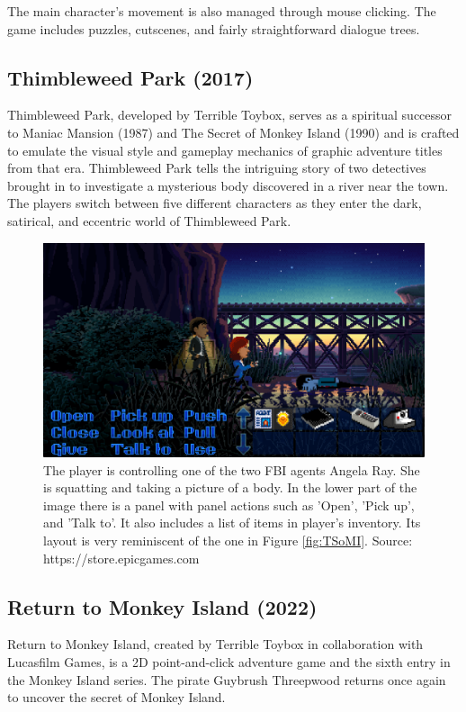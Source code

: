 The main character's movement is also managed through mouse clicking. The game includes puzzles, cutscenes, and fairly straightforward dialogue trees.




\subsection{Thimbleweed Park (2017)}
Thimbleweed Park, developed by Terrible Toybox, serves as a spiritual successor to Maniac Mansion (1987) and The Secret of Monkey Island (1990) and is crafted to emulate the visual style and gameplay mechanics of graphic adventure titles from that era. Thimbleweed Park tells the intriguing story of two detectives brought in to investigate a mysterious body discovered in a river near the town. The players switch between five different characters as they enter the dark, satirical, and eccentric world of Thimbleweed Park\cite{Matulef2014}.


\begin{figure}[H]
\centering
\includegraphics[width=1.\linewidth]{img/TWP.png}
\caption{The player is controlling one of the two FBI agents Angela Ray. She is squatting and taking a picture of a body. In the lower part of the image there is a panel with panel actions such as 'Open', 'Pick up', and 'Talk to'. It also includes a list of items in player's inventory. Its layout is very reminiscent of the one in Figure \ref{fig:TSoMI}. Source: https://store.epicgames.com \cite{epic:TWP}}
\label{fig:TWP}
\end{figure}



\subsection{Return to Monkey Island (2022)}
Return to Monkey Island, created by Terrible Toybox in collaboration with Lucasfilm Games, is a 2D point-and-click adventure game and the sixth entry in the Monkey Island series. The pirate Guybrush Threepwood returns once again to uncover the secret of Monkey Island\cite{McCaffrey2022}.

